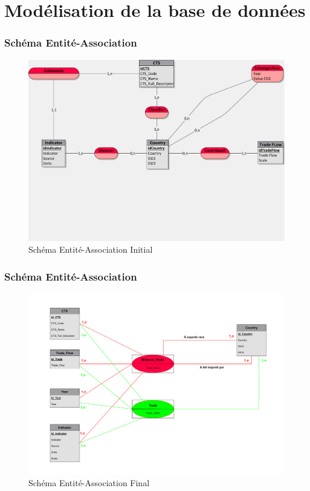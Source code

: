 \documentclass[11pt]{beamer}
\begin{document}
\section{Modélisation de la base de données}

\begin{frame}
	\frametitle{Schéma Entité-Association}
	
	\begin{figure}
		\includegraphics[width=0.8\linewidth]{../schema_ea/schema_EA_initial.pdf}
		\caption{Schéma Entité-Association Initial}
	\end{figure}
\end{frame}


\begin{frame}
	\frametitle{Schéma Entité-Association}
	
	\begin{figure}
		\includegraphics[width=0.8\linewidth]{../schema_ea/schema_EA_final.pdf}
		\caption{Schéma Entité-Association Final}
	\end{figure}
\end{frame}
\end{document}
